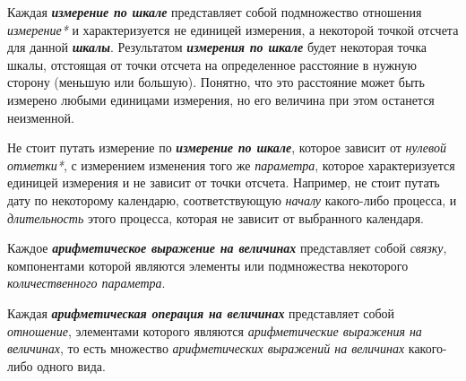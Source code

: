 Каждая \textbf{\textit{измерение по шкале}} представляет собой подмножество отношения \textit{измерение*} и характеризуется не единицей измерения, а некоторой точкой отсчета для данной \textbf{\textit{шкалы}}. Результатом \textbf{\textit{измерения по шкале}} будет некоторая точка шкалы, отстоящая от точки отсчета на определенное расстояние в нужную сторону (меньшую или большую). Понятно, что это расстояние может быть измерено любыми единицами измерения, но его величина при этом останется неизменной.
		
Не стоит путать измерение по \textbf{\textit{измерение по шкале}}, которое зависит от \textit{нулевой отметки*}, с измерением изменения того же \textit{параметра}, которое характеризуется единицей измерения и не зависит от точки отсчета. Например, не стоит путать дату по некоторому календарю, соответствующую \textit{началу} какого-либо процесса, и \textit{длительность} этого процесса, которая не зависит от выбранного календаря.

	
%	

Каждое \textbf{\textit{арифметическое выражение на величинах}} представляет собой \textit{связку}, компонентами которой являются элементы или подмножества некоторого \textit{количественного параметра}.

\begin{SCn}
\end{SCn}

Каждая \textbf{\textit{арифметическая операция на величинах}} представляет собой \textit{отношение}, элементами которого являются \textit{арифметические выражения на величинах}, то есть множество \textit{арифметических выражений на величинах} какого-либо одного вида.
	
